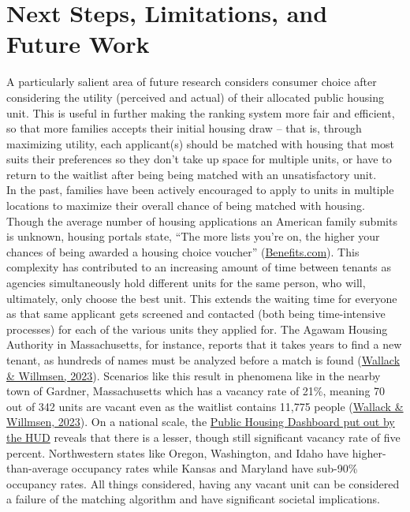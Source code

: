 \documentclass[11pt]{article}
\begin{document}
\section{Next Steps, Limitations, and Future Work}
A particularly salient area of future research considers consumer choice after considering the utility (perceived and actual) of their allocated public housing unit. This is useful in further making the ranking system more fair and efficient, so that more families accepts their initial housing draw – that is, through maximizing utility, each applicant(s) should be matched with housing that most suits their preferences so they don’t take up space for multiple units, or have to return to the waitlist after being being matched with an unsatisfactory unit. \\
\newline
In the past, families have been actively encouraged to apply to units in multiple locations to maximize their overall chance of being matched with housing. Though the average number of housing applications an American family submits is unknown, housing portals state, “The more lists you’re on, the higher your chances of being awarded a housing choice voucher” (\href{https://benefits.com/section-8/waiting-list/#:~:text=You%20can%20also%20apply%20with,awarded%20a%20housing%20choice%20voucher.}{Benefits.com}). This complexity has contributed to an increasing amount of time between tenants as agencies simultaneously hold different units for the same person, who will, ultimately, only choose the best unit. This extends the waiting time for everyone as that same applicant gets screened and contacted (both being time-intensive processes) for each of the various units they applied for. The Agawam Housing Authority in Massachusetts, for instance, reports that it takes years to find a new tenant, as hundreds of names must be analyzed before a match is found (\href{https://www.wbur.org/news/2023/09/19/massachusetts-state-funded-public-housing-waitlist-vacant}{Wallack \& Willmsen, 2023}). Scenarios like this result in phenomena like in the nearby town of Gardner, Massachusetts which has a vacancy rate of 21\%, meaning 70 out of 342 units are vacant even as the waitlist contains 11,775 people (\href{https://www.wbur.org/news/2023/09/19/massachusetts-state-funded-public-housing-waitlist-vacant}{Wallack \& Willmsen, 2023}). On a national scale, the \href{https://www.google.com/url?q=https://www.hud.gov/program_offices/public_indian_housing/programs/ph/PH_Dashboard?utm_medium%3Demail%26utm_source%3Dgovdelivery&sa=D&source=docs&ust=1697432365239122&usg=AOvVaw2yT-DQb6XprsdCaD2vsE1k}{Public Housing Dashboard put out by the HUD} reveals that there is a lesser, though still significant vacancy rate of five percent. Northwestern states like Oregon, Washington, and Idaho have higher-than-average occupancy rates while Kansas and Maryland have sub-90\% occupancy rates. All things considered, having any vacant unit can be considered a failure of the matching algorithm and have significant societal implications. \\
\end{document}
